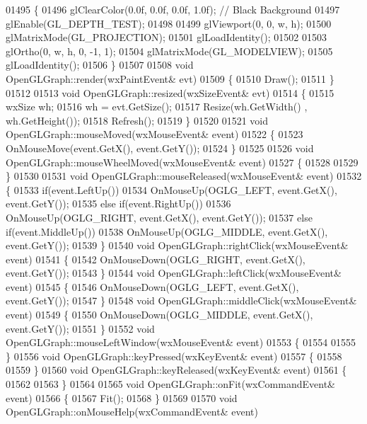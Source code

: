 \begin{DoxyCode}
{{{{{{{{{{{{{{{{01495 \{
01496     glClearColor(0.0f, 0.0f, 0.0f, 1.0f); \textcolor{comment}{// Black Background}
01497     glEnable(GL_DEPTH_TEST);
01498 
01499     glViewport(0, 0, w, h);
01500     glMatrixMode(GL_PROJECTION);
01501     glLoadIdentity();
01502 
01503     glOrtho(0, w, h, 0, -1, 1);
01504     glMatrixMode(GL_MODELVIEW);
01505     glLoadIdentity();
01506 \}
01507 
01508 \textcolor{keywordtype}{void} OpenGLGraph::render(wxPaintEvent& evt)
01509 \{
01510     Draw();
01511 \}
01512 
01513 \textcolor{keywordtype}{void} OpenGLGraph::resized(wxSizeEvent& evt)
01514 \{
01515     wxSize wh;
01516     wh = evt.GetSize();
01517     Resize(wh.GetWidth() , wh.GetHeight());
01518     Refresh();
01519 \}
01520 
01521 \textcolor{keywordtype}{void} OpenGLGraph::mouseMoved(wxMouseEvent& event)
01522 \{
01523     OnMouseMove(event.GetX(), \textcolor{keyword}{event}.GetY());
01524 \}
01525 
01526 \textcolor{keywordtype}{void} OpenGLGraph::mouseWheelMoved(wxMouseEvent& event)
01527 \{
01528 
01529 \}
01530 
01531 \textcolor{keywordtype}{void} OpenGLGraph::mouseReleased(wxMouseEvent& event)
01532 \{
01533     \textcolor{keywordflow}{if}(event.LeftUp())
01534         OnMouseUp(OGLG_LEFT, event.GetX(), \textcolor{keyword}{event}.GetY());
01535     \textcolor{keywordflow}{else} \textcolor{keywordflow}{if}(event.RightUp())
01536         OnMouseUp(OGLG_RIGHT, event.GetX(), \textcolor{keyword}{event}.GetY());
01537     \textcolor{keywordflow}{else} \textcolor{keywordflow}{if}(event.MiddleUp())
01538         OnMouseUp(OGLG_MIDDLE, event.GetX(), \textcolor{keyword}{event}.GetY());
01539 \}
01540 \textcolor{keywordtype}{void} OpenGLGraph::rightClick(wxMouseEvent& event)
01541 \{
01542     OnMouseDown(OGLG_RIGHT, event.GetX(), \textcolor{keyword}{event}.GetY());
01543 \}
01544 \textcolor{keywordtype}{void} OpenGLGraph::leftClick(wxMouseEvent& event)
01545 \{
01546     OnMouseDown(OGLG_LEFT, event.GetX(), \textcolor{keyword}{event}.GetY());
01547 \}
01548 \textcolor{keywordtype}{void} OpenGLGraph::middleClick(wxMouseEvent& event)
01549 \{
01550     OnMouseDown(OGLG_MIDDLE, event.GetX(), \textcolor{keyword}{event}.GetY());
01551 \}
01552 \textcolor{keywordtype}{void} OpenGLGraph::mouseLeftWindow(wxMouseEvent& event)
01553 \{
01554 
01555 \}
01556 \textcolor{keywordtype}{void} OpenGLGraph::keyPressed(wxKeyEvent& event)
01557 \{
01558 
01559 \}
01560 \textcolor{keywordtype}{void} OpenGLGraph::keyReleased(wxKeyEvent& event)
01561 \{
01562 
01563 \}
01564 
01565 \textcolor{keywordtype}{void} OpenGLGraph::onFit(wxCommandEvent& event)
01566 \{
01567     Fit();
01568 \}
01569 
01570 \textcolor{keywordtype}{void} OpenGLGraph::onMouseHelp(wxCommandEvent& event)
}}}}}}}}}}}}}}}}
\end{DoxyCode}
